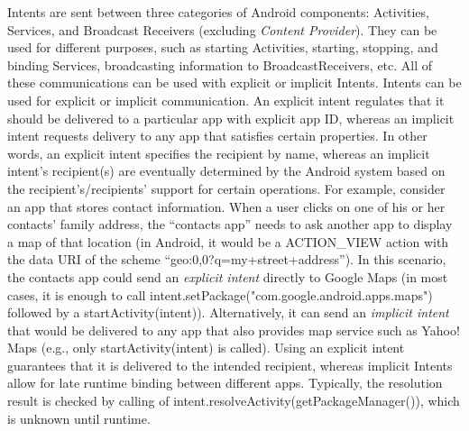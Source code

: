 Intents are sent between three categories of Android components: Activities, Services, and Broadcast Receivers (excluding \emph{Content Provider}). They can be used for different purposes, such as starting Activities, starting, stopping, and binding Services, broadcasting information to BroadcastReceivers, etc. All of these communications can be used with explicit or implicit Intents.
Intents can be used for explicit or implicit communication. An explicit intent regulates that it should be delivered to a particular app with explicit app ID, whereas an implicit intent requests delivery to any app that satisfies certain properties. In other words, an explicit intent specifies the recipient by name, whereas an implicit intent's recipient(s) are eventually determined by the Android system based on the recipient's/recipients' support for certain operations. For example, consider an app that stores contact information. When a user clicks on one of his or her contacts' family address, the ``contacts app'' needs to ask another app to display a map of that location (in Android, it would be a \textsf{ACTION\_VIEW} action with the data URI of the scheme ``\textsf{geo:0,0?q=my+street+address}''). In this scenario, the contacts app could send an \emph{explicit intent} directly to Google Maps (in most cases, it is enough to call \textsf{intent.setPackage("com.google.android.apps.maps")} followed by a \textsf{startActivity(intent)}). Alternatively, it can send an \emph{implicit intent} that would be delivered to any app that also provides map service such as Yahoo! Maps (e.g., only \textsf{startActivity(intent)} is called). Using an explicit intent guarantees that it is delivered to the intended recipient, whereas implicit Intents allow for late runtime binding between different apps. {Typically, the resolution result is checked by calling of \textsf{intent.resolveActivity(getPackageManager())}, which is unknown until runtime.}